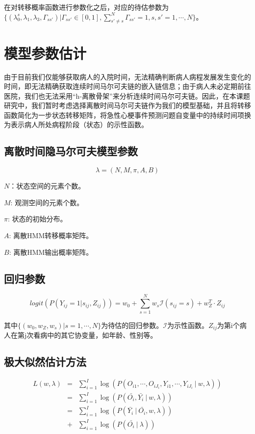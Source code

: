 \documentclass{article}
\newcommand{\nb}{\nonumber}
\begin{document}
在对转移概率函数进行参数化之后，对应的待估参数为$\{(\lambda_0^s,\lambda_1,\lambda_3,\Gamma_{ss'})|\Gamma_{ss'}\in [0,1],\sum_{s'\neq s}^{N}\Gamma_{ss'}=1 ,s,s'=1,\cdots,N\}$。

\section{模型参数估计}
由于目前我们仅能够获取病人的入院时间，无法精确判断病人病程发展发生变化的时间，即无法精确获取连续时间马尔可夫链的嵌入链信息；由于病人未必定期前往医院，我们也无法采用“h-离散骨架”来分析连续时间马尔可夫链。因此，在本课题研究中，我们暂时考虑选择离散时间马尔可夫链作为我们的模型基础，并且将转移函数简化为一步状态转移矩阵，将急性心梗事件预测问题自变量中的持续时间项换为表示病人所处病程阶段（状态）的示性函数。


\subsection{离散时间隐马尔可夫模型参数}
$$\lambda=(N,M,\pi,A,B)$$

$N$：状态空间的元素个数。

$M$: 观测空间的元素个数。

$\pi$: 状态的初始分布。

$A$: 离散HMM转移概率矩阵。

$B$: 离散HMM输出概率矩阵。

\subsection{回归参数}

$$ logit(P(Y_{ij}=1|s_{ij},Z_{ij}))=w_0+\sum\limits_{s=1}^N w_s \mathcal{I}(s_{ij}=s)+w^T_Z\cdot Z_{ij}$$

其中$\{(w_0,w_Z,w_s)|s=1,\cdots,N\}$为待估的回归参数。$\mathcal{I}$为示性函数。$Z_{ij}$为第i个病人在第j次看病中的其它协变量，如年龄、性别等。

\subsection{极大似然估计方法}

\begin{eqnarray}
    L(w,\lambda)&=&\sum\limits_{i=1}^{I} \log(P(O_{i1},\cdots,O_{iJ_{i}},Y_{i1},\cdots,Y_{iJ_{i}}~|~w,\lambda))\nb\\
    &=&\sum\limits_{i=1}^{I} \log(P(\bar{O_{i}},\bar{Y_{i}}~|~w,\lambda))\nb\\
    &=&\sum\limits_{i=1}^{I} \log(P(\bar{Y_{i}}~|~\bar{O_{i}},w,\lambda))\\
    &+& \sum\limits_{i=1}^{I}\log(P(\bar{O_{i}}~|~\lambda))
\end{eqnarray}
\end{document}
